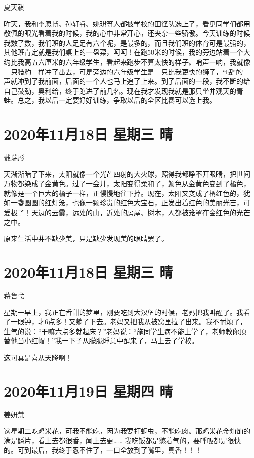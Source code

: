 夏天祺

昨天，我和李恩博、孙轩睿、姚琪等人都被学校的田径队选上了，看见同学们都用敬佩的眼光看着我的时候，我的心中非常开心，还夹杂一些骄傲。今天训练的时候我数了数，我们班的人足足有六个呢，是最多的，而且我们班的体育可是最强的，其他班肯定就是我们桌上的一盘菜，呵呵！在跑50米的时候，我的旁边站着一个大约比我高五六厘米的六年级学生，看起来跑步不算太快的样子。哨声一响，我就像一只猎豹一样冲了出去，可是旁边的六年级学生是一只比我更快的狮子，“嗖”的一声就冲到了我前面，后面的一个人也马上追了上来。到了后面的一段，我不断的给自己鼓劲，奥利给，终于跑进了前几名。现在我才发现我就是那只坐井观天的青蛙。总之，我以后一定要好好训练，争取以后的全区比赛可以选上我。

\section{2020年11月18日 星期三 晴}

戴瑞彤

天渐渐暗了下来，太阳就像一个光芒四射的大火球，照得我都睁不开眼睛，把世间万物都染成了金黄色。过了一会儿，太阳变得柔和了，颜色从金黄色变到了橘色，就像是一个巨大的橘子一样，正慢慢地往下掉。现在，太阳又变成了橘红色的，犹如一盏圆圆的红灯笼，也像一颗珍贵的红色大宝石，正发出着红色的美丽光芒，可爱极了！天边的云霞，远处的山，近处的房屋、树木，人都被笼罩在金红色的光芒之中。

原来生活中并不缺少美，只是缺少发现美的眼睛罢了。

\section{2020年11月18日 星期三 晴}

蒋鲁弋

星期一早上，我正在香甜的梦里，刚要吃到大汉堡的时候，老妈把我叫醒了。我看了一眼钟，才6点多！又躺了下去。老妈又把我从被窝里拉了出来。我不耐烦了，生气的说：“干嘛六点多就起床？”老妈说：“施同学生病不能上学了，老师教你顶替他当小红帽！”我一下子从朦胧睡意中醒来了，马上去了学校。

这可真是喜从天降啊！

\section{2020年11月19日 星期四 晴}

姜姸慧

这星期二吃鸡米花，可我不能吃，因为我要打蛔虫，不能吃肉。那鸡米花金灿灿的满是鳞片，看上去都很香，闻上去更…… 我吃饭都是憋着气的，要呼吸都是很快的。可到最后，我终于忍不住了，一口全放到了嘴里，真香！！！

